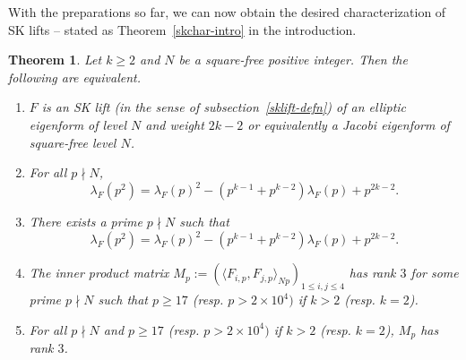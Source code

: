 \documentclass[11pt]{amsart}
\numberwithin{equation}{section}
\theoremstyle{plain}
\newtheorem{thm}{Theorem}[section]
\theoremstyle{definition}
\newcommand{\thmref}[1]{Theorem~\ref{#1}}
\newcommand{\lan}{\langle }
\newcommand{\ran}{\rangle}
\begin{document}
With the preparations so far, we can now obtain the desired characterization of SK lifts -- stated as \thmref{skchar-intro} in the introduction.
\begin{thm}\label{th:SKChar}
     Let $k \ge 2$ and $N$ be a square-free positive integer. Then the following are equivalent.
    \begin{enumerate}
        \item 
        $F$ is an SK lift (in the sense of subsection~\ref{sklift-defn}) of an elliptic eigenform of level $N$ and weight $2k-2$ or equivalently a Jacobi eigenform of square-free level $N$.
        
         \item 
         For all $p \nmid N$,
        \begin{equation*}
            \lambda_F(p^2)=\lambda_F(p)^2-(p^{k-1}+p^{k-2})\lambda_F(p)+p^{2k-2}.
        \end{equation*}
        
        \item 
        There exists a prime $p\nmid N$  such that
        \begin{equation*}
            \lambda_F(p^2)=\lambda_F(p)^2-(p^{k-1}+p^{k-2})\lambda_F(p)+p^{2k-2}.
        \end{equation*}
        
        \item 
        The inner product matrix $M_p:=\left(\lan F_{i,p}, F_{j,p} \ran_{Np} \right)_{1\le i, j\le 4}$ has rank $3$ for some prime $p\nmid N$ such that $p\ge 17$ (resp. $p> 2\times 10^4)$ if $k>2$ (resp. $k=2$).
        
        \item For all $p \nmid N$ and $p\ge 17$ (resp. $p> 2\times 10^4)$ if $k>2$ (resp. $k=2$), $M_p$ has rank $3$.
    \end{enumerate}
\end{thm}
\end{document}

